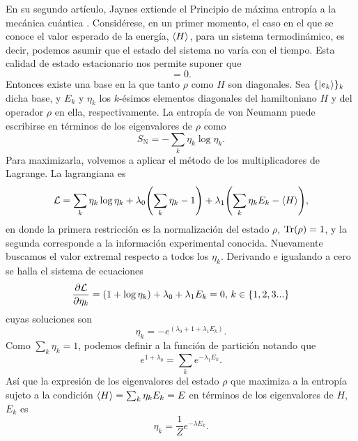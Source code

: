 En su segundo artículo, Jaynes extiende el Principio de máxima entropía a la mecánica cuántica \cite{JaynesII}. Considérese, en un primer momento, el caso en el que se conoce el valor esperado de la energía, $\expval{H}$, para un sistema termodinámico, es decir, podemos asumir que el estado del sistema no varía con el tiempo. Esta calidad de estado estacionario nos permite suponer que
\begin{equation}
    [\rho,H]=0.\nonumber
\end{equation}
Entonces existe una base en la que tanto $\rho$ como $H$ son diagonales. Sea $\{\ket{e_{k}}\}_{k}$ dicha base, y $E_{k}$ y $\eta_{k}$ los $k$-ésimos elementos diagonales del hamiltoniano $H$ y del operador $\rho$ en ella, respectivamente. La entropía de von Neumann puede escribirse en términos de los eigenvalores de $\rho$ como
\begin{equation}
    S_{\text{N}}=-\sum_{k}\eta_{k}\log{\eta_{k}}.\nonumber
\end{equation}
Para maximizarla, volvemos a aplicar el método de los multiplicadores de Lagrange. La lagrangiana es
\begin{equation}
    \mathcal{L}=\sum_{k}\eta_{k}\log{\eta_{k}}+\lambda_{0}\qty(\sum_{k}\eta_{k}-1)+\lambda_{1}\qty(\sum_{k}\eta_{k}E_{k}-\expval{H}),\nonumber
\end{equation}
en donde la primera restricción es la normalización del estado $\rho$, $\Tr(\rho)=1$, y la segunda corresponde a la información experimental conocida. Nuevamente buscamos el valor extremal respecto a todos los $\eta_{k}$. Derivando e igualando a cero se halla el sistema de ecuaciones
\begin{equation}
    \frac{\partial \mathcal{L}}{\partial \eta_{k}}=(1+\log{\eta_{k}})+\lambda_{0}+\lambda_{1}E_{k}=0, \,k\in\{1,2,3...\}\nonumber
\end{equation}
cuyas soluciones son
\begin{equation}
    \eta_{k}=-e^{(\lambda_{0}+1+\lambda_{1}E_{k})}.\nonumber
\end{equation}
Como $\sum_{k}\eta_{k}=1$, podemos definir a la función de partición notando que
\begin{equation}
    e^{1+\lambda_{0}}=\sum_{k}e^{-\lambda_{1}E_{k}}.\nonumber
\end{equation}
Así que la expresión de los eigenvalores del estado $\rho$ que maximiza a la entropía sujeto a la condición $\expval{H}=\sum_{k}\eta_{k}E_{k}=E$ en términos de los eigenvalores de $H$, $E_{k}$ es
\begin{equation}
    \eta_{k}=\frac{1}{Z}e^{-\lambda E_{k}}.\nonumber
\end{equation}
